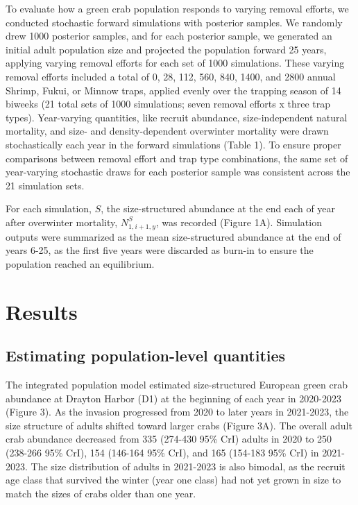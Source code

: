 \documentclass{article}
\begin{document}
To evaluate how a green crab population responds to varying removal efforts, we conducted stochastic forward simulations with posterior samples. We randomly drew 1000 posterior samples, and for each posterior sample, we generated an initial adult population size and projected the population forward 25 years, applying varying removal efforts for each set of 1000 simulations. These varying removal efforts included a total of 0, 28, 112, 560, 840, 1400, and 2800 annual Shrimp, Fukui, or Minnow traps, applied evenly over the trapping season of 14 biweeks (21 total sets of 1000 simulations; seven removal efforts x three trap types). Year-varying quantities, like recruit abundance, size-independent natural mortality, and size- and density-dependent overwinter mortality were drawn stochastically each year in the forward simulations (Table 1). To ensure proper comparisons between removal effort and trap type combinations, the same set of year-varying stochastic draws for each posterior sample was consistent across the 21 simulation sets. 

For each simulation, $S$, the size-structured abundance at the end each of year after overwinter mortality, $N^S_{1,i+1,y}$, was recorded (Figure 1A). Simulation outputs were summarized as the mean size-structured abundance at the end of years 6-25, as the first five years were discarded as burn-in to ensure the population reached an equilibrium.

\section{Results}

\subsection{Estimating population-level quantities}

The integrated population model estimated size-structured European green crab abundance at Drayton Harbor (D1) at the beginning of each year in 2020-2023 (Figure 3). As the invasion progressed from 2020 to later years in 2021-2023, the size structure of adults shifted toward larger crabs (Figure 3A). The overall adult crab abundance decreased from 335 (274-430 95\% CrI) adults in 2020 to 250 (238-266 95\% CrI), 154 (146-164 95\% CrI), and 165 (154-183 95\% CrI) in 2021-2023. The size distribution of adults in 2021-2023 is also bimodal, as the recruit age class that survived the winter (year one class) had not yet grown in size to match the sizes of crabs older than one year.
\end{document}
